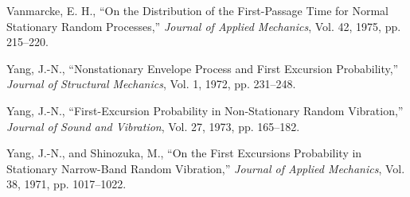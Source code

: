 \documentclass[12pt]{article}
\begin{document}
\begin{thebibliography}{99}
Vanmarcke, E. H., ``On the Distribution of the First-Passage Time for Normal Stationary Random Processes,'' \emph{Journal of Applied Mechanics}, Vol. 42, 1975, pp. 215--220.

Yang, J.-N., ``Nonstationary Envelope Process and First Excursion Probability,'' \emph{Journal of Structural Mechanics}, Vol. 1, 1972, pp. 231--248.

Yang, J.-N., ``First-Excursion Probability in Non-Stationary Random Vibration,'' \emph{Journal of Sound and Vibration}, Vol. 27, 1973, pp. 165--182.

Yang, J.-N., and Shinozuka, M., ``On the First Excursions Probability in Stationary Narrow-Band Random Vibration,'' \emph{Journal of Applied Mechanics}, Vol. 38, 1971, pp. 1017--1022.
\end{thebibliography}
\end{document}
